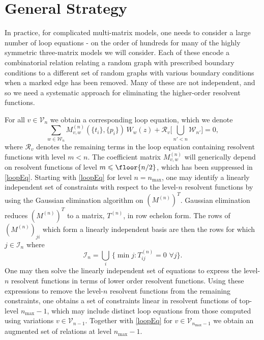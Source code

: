 \section{General Strategy}

In practice, for complicated multi-matrix models, one needs to consider a large number of loop
equations - on the order of hundreds for many of the highly symmetric three-matrix models we will
consider. Each of these encode a combinatorial relation relating a random graph with prescribed
boundary conditions to a different set of random graphs with various boundary conditions when a
marked edge has been removed. Many of these are not independent, and so we need a systematic
approach for eliminating the higher-order resolvent functions.

For all $v\in \mathcal{V}_n$ we obtain a corresponding loop equation, which we denote
%
\begin{equation}
    \label{loopEq}
    \sum_{w\in\mathcal{W}_n} M_{v,w}^{(n)}\left(\{t_i\},\{p_i\}\right) \, W_{w}(z) + \mathcal{R}_v \big[ \bigcup_{n'<n} \mathcal{W}_{n'} \big] = 0,
\end{equation}
%
where $\mathcal{R}_v$ denotes the remaining terms in the loop equation containing resolvent
functions with level $m < n$. The coefficient matrix $M^{(n)}_{v,w}$ will generically depend on
resolvent functions of level $m \leqslant \floor{n/2}$, which has been suppressed in
\eqref{loopEq}. Starting with \eqref{loopEq} for level $n=n_{\text{max}}$, one may identify a
linearly independent set of constraints with respect to the level-$n$ resolvent functions by using
the Gaussian elimination algorithm on $(M^{(n)})^T$. Gaussian elimination reduces $(M^{(n)})^T$ to
a matrix, $T^{(n)}$, in row echelon form. The rows of $(M^{(n)})_{ji}$ which form a linearly
independent basis are then the rows for which $j\in\mathcal{I}_n$ where
%
\begin{equation}
    \label{linInd}
    \mathcal{I}_n = \bigcup_i \, \{ \min{j} : T_{ij}^{(n)} = 0 \, \, \forall j \}.
\end{equation}
%
One may then solve the linearly independent set of equations to express the level-$n$ resolvent
functions in terms of lower order resolvent functions. Using these expressions to remove the
level-$n$ resolvent functions from the remaining constraints, one obtains a set of constraints
linear in resolvent functions of top-level $n_{\text{max}}-1$, which may include distinct loop
equations from those computed using variations $v\in\mathcal{V}_{n-1}$. Together with
\eqref{loopEq} for $v\in\mathcal{V}_{n_{\text{max}}-1}$ we obtain an augmented set of relations at
level $n_{\text{max}}-1$.

